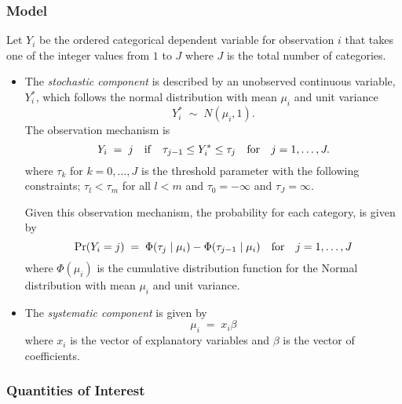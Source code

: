 \documentclass{article}
\begin{document}
\subsubsection{Model}
  Let $Y_i$ be the ordered categorical dependent variable for
  observation $i$ that takes one of the integer values from $1$ to $J$
  where $J$ is the total number of categories.
\begin{itemize}
\item The \emph{stochastic component} is described by an unobserved continuous
  variable, $Y^*_i$, which follows the normal distribution with mean
  $\mu_i$ and unit variance
  \begin{equation*}
    Y_i^* \; \sim \; N(\mu_i, 1). 
  \end{equation*}
  The observation mechanism is 
  \begin{equation*}
    Y_i \; = \; j \quad {\rm if} \quad \tau_{j-1} \le Y_i^* \le \tau_j
    \quad {\rm for} \quad j=1,\dots,J.
  \end{equation*}
  where $\tau_k$ for $k=0,\dots,J$ is the threshold parameter with the
  following constraints; $\tau_l < \tau_m$ for all $l<m$ and
  $\tau_0=-\infty$ and $\tau_J=\infty$.
  
  Given this observation mechanism, the probability for each category,
  is given by
  \begin{equation*}
    \Pr(Y_i = j) \; = \; \Phi(\tau_{j} \mid \mu_i) - \Phi(\tau_{j-1} \mid
    \mu_i) \quad {\rm for} \quad j=1,\dots,J
  \end{equation*}
  where $\Phi(\mu_i)$ is the cumulative distribution function for the
  Normal distribution with mean $\mu_i$ and unit variance.
  
\item The \emph{systematic component} is given by
  \begin{equation*}
    \mu_i \; = \; x_i \beta
  \end{equation*}
  where $x_i$ is the vector of explanatory variables and $\beta$ is
  the vector of coefficients.
\end{itemize}

\subsubsection{Quantities of Interest} 
\end{document}
